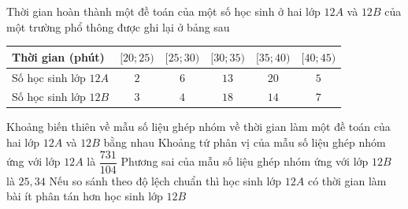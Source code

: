 \begin{ex}%
	Thời gian hoàn thành một đề toán của một số học sinh ở hai lớp $12A$ và $12B$ của một trường phổ thông được ghi lại ở bảng sau
	\begin{center}
	\begin{tabular}{|l|c|c|c|c|c|}
		\hline
		Thời gian (phút) & {$[20; 25)$} & {$[25; 30)$} & {$[30; 35)$} & {$[35; 40)$} & {$[40; 45)$} \\
		\hline
		Số học sinh lớp $12A$ & $2$ & $6$ & $13$ & $20$ & $5$ \\
		\hline
		Số học sinh lớp $12B$ & $3$ & $4$ & $18$ & $14$ & $7$ \\
		\hline
	\end{tabular}
\end{center}
	\choiceTF
	{\True Khoảng biến thiên về mẫu số liệu ghép nhóm về thời gian làm một đề toán của hai lớp $12A$ và $12B$ bằng nhau}
	{\True Khoảng tứ phân vị của mẫu số liệu ghép nhóm ứng với lớp $12A$ là $\dfrac{731}{104}$}
	{Phương sai của mẫu số liệu ghép nhóm ứng với lớp $12B$ là $25{,}34$}
	{\True Nếu so sánh theo độ lệch chuẩn thì học sinh lớp $12A$ có thời gian làm bài ít phân tán hơn học sinh lớp $12B$}
\end{ex}
